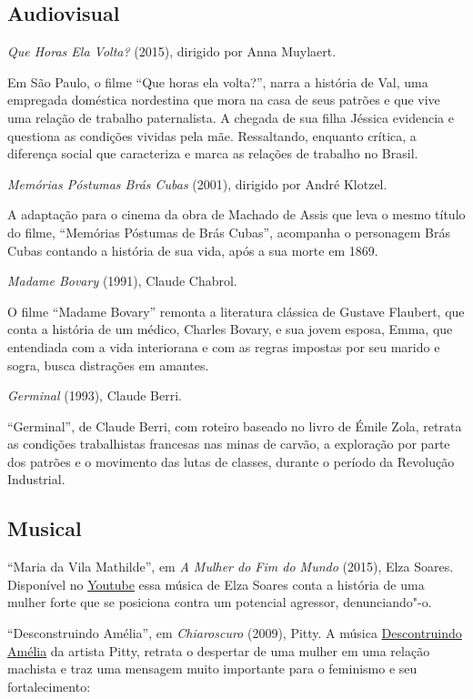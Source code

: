 \documentclass[12pt]{extarticle}
\begin{document}
\subsection{Audiovisual}

\emph{Que Horas Ela Volta?} (2015), dirigido por Anna Muylaert.

Em São Paulo, o filme ``Que horas ela volta?'', narra a história de Val, 
uma empregada doméstica nordestina que mora na casa de seus patrões e 
que vive uma relação de trabalho paternalista. A chegada de sua filha 
Jéssica evidencia e questiona as condições vividas pela mãe. Ressaltando, 
enquanto crítica, a diferença social que caracteriza e marca as relações 
de trabalho no Brasil. 

\emph{Memórias Póstumas Brás Cubas} (2001), dirigido por André Klotzel.
 
A adaptação para o cinema da obra de Machado de Assis que leva o mesmo título 
do filme, ``Memórias Póstumas de Brás Cubas'', acompanha o personagem Brás Cubas 
contando a história de sua vida, após a sua morte em 1869.

\emph{Madame Bovary} (1991), Claude Chabrol.

O filme ``Madame Bovary'' remonta a literatura clássica de Gustave Flaubert, que conta 
a história de um médico, Charles Bovary, e sua jovem esposa, Emma, que entendiada com a 
vida interiorana e com as regras impostas por seu marido e sogra, busca distrações em 
amantes.

\emph{Germinal} (1993), Claude Berri.

``Germinal'', de Claude Berri, com roteiro baseado no livro de Émile Zola, retrata as 
condições trabalhistas francesas nas minas de carvão, a exploração por parte dos 
patrões e o movimento das lutas de classes, durante o período 
da Revolução Industrial.

\subsection{Musical}

``Maria da Vila Mathilde'', em \emph{A Mulher do Fim do Mundo} (2015), Elza Soares.
Disponível no \href{https://www.youtube.com/watch?v=-09qfhVdzz8&ab_channel=circus}{Youtube} 
essa música de Elza Soares conta a história de uma mulher forte que se posiciona contra 
um potencial agressor, denunciando"-o. 

``Desconstruindo Amélia'', em \emph{Chiaroscuro} (2009), Pitty.
A música \href{https://www.youtube.com/watch?v=ygcrcRgVxMI&ab_channel=PittyNews}{Descontruindo Amélia} da artista Pitty, 
retrata o despertar de uma mulher em uma relação machista e traz uma mensagem muito importante para o feminismo e seu 
fortalecimento: 
\end{document}
